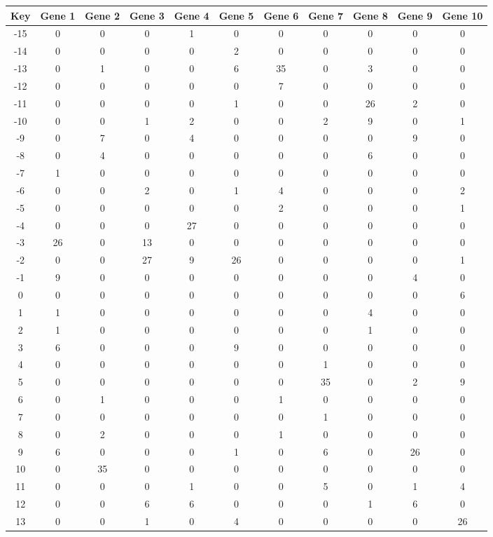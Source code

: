\begin{tabular}{|c|c|c|c|c|c|c|c|c|c|c|}
\hline
Key & Gene 1 & Gene 2 & Gene 3 & Gene 4 & Gene 5 & Gene 6 & Gene 7 & Gene 8 & Gene 9 & Gene 10 \\
\hline
-15 & 0 & 0 & 0 & 1 & 0 & 0 & 0 & 0 & 0 & 0 \\
-14 & 0 & 0 & 0 & 0 & 2 & 0 & 0 & 0 & 0 & 0 \\
-13 & 0 & 1 & 0 & 0 & 6 & 35 & 0 & 3 & 0 & 0 \\
-12 & 0 & 0 & 0 & 0 & 0 & 7 & 0 & 0 & 0 & 0 \\
-11 & 0 & 0 & 0 & 0 & 1 & 0 & 0 & 26 & 2 & 0 \\
-10 & 0 & 0 & 1 & 2 & 0 & 0 & 2 & 9 & 0 & 1 \\
-9 & 0 & 7 & 0 & 4 & 0 & 0 & 0 & 0 & 9 & 0 \\
-8 & 0 & 4 & 0 & 0 & 0 & 0 & 0 & 6 & 0 & 0 \\
-7 & 1 & 0 & 0 & 0 & 0 & 0 & 0 & 0 & 0 & 0 \\
-6 & 0 & 0 & 2 & 0 & 1 & 4 & 0 & 0 & 0 & 2 \\
-5 & 0 & 0 & 0 & 0 & 0 & 2 & 0 & 0 & 0 & 1 \\
-4 & 0 & 0 & 0 & 27 & 0 & 0 & 0 & 0 & 0 & 0 \\
-3 & 26 & 0 & 13 & 0 & 0 & 0 & 0 & 0 & 0 & 0 \\
-2 & 0 & 0 & 27 & 9 & 26 & 0 & 0 & 0 & 0 & 1 \\
-1 & 9 & 0 & 0 & 0 & 0 & 0 & 0 & 0 & 4 & 0 \\
0 & 0 & 0 & 0 & 0 & 0 & 0 & 0 & 0 & 0 & 6 \\
1 & 1 & 0 & 0 & 0 & 0 & 0 & 0 & 4 & 0 & 0 \\
2 & 1 & 0 & 0 & 0 & 0 & 0 & 0 & 1 & 0 & 0 \\
3 & 6 & 0 & 0 & 0 & 9 & 0 & 0 & 0 & 0 & 0 \\
4 & 0 & 0 & 0 & 0 & 0 & 0 & 1 & 0 & 0 & 0 \\
5 & 0 & 0 & 0 & 0 & 0 & 0 & 35 & 0 & 2 & 9 \\
6 & 0 & 1 & 0 & 0 & 0 & 1 & 0 & 0 & 0 & 0 \\
7 & 0 & 0 & 0 & 0 & 0 & 0 & 1 & 0 & 0 & 0 \\
8 & 0 & 2 & 0 & 0 & 0 & 1 & 0 & 0 & 0 & 0 \\
9 & 6 & 0 & 0 & 0 & 1 & 0 & 6 & 0 & 26 & 0 \\
10 & 0 & 35 & 0 & 0 & 0 & 0 & 0 & 0 & 0 & 0 \\
11 & 0 & 0 & 0 & 1 & 0 & 0 & 5 & 0 & 1 & 4 \\
12 & 0 & 0 & 6 & 6 & 0 & 0 & 0 & 1 & 6 & 0 \\
13 & 0 & 0 & 1 & 0 & 4 & 0 & 0 & 0 & 0 & 26 \\
\hline
\end{tabular}